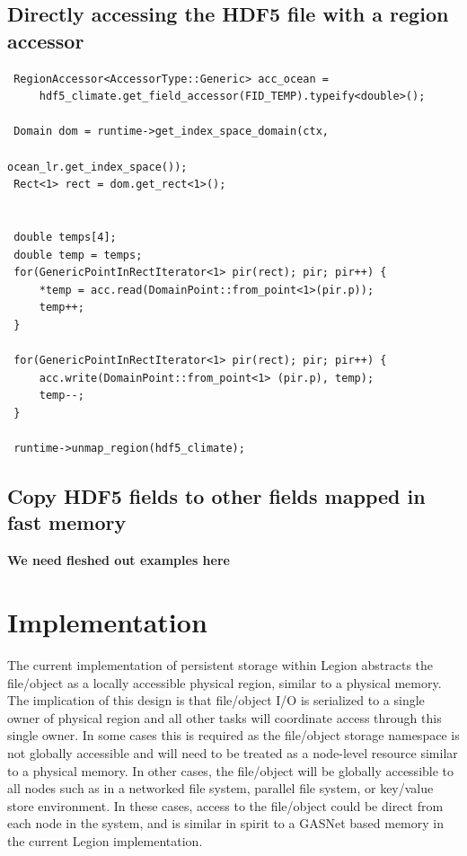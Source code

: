 \documentclass{article}
\begin{document}
 \subsection{Directly accessing the HDF5 file with a region accessor}
 \begin{lstlisting}
 RegionAccessor<AccessorType::Generic> acc_ocean =
     hdf5_climate.get_field_accessor(FID_TEMP).typeify<double>();
 
 Domain dom = runtime->get_index_space_domain(ctx,
                                              ocean_lr.get_index_space());
 Rect<1> rect = dom.get_rect<1>();
 
 
 double temps[4];
 double temp = temps;
 for(GenericPointInRectIterator<1> pir(rect); pir; pir++) { 
     *temp = acc.read(DomainPoint::from_point<1>(pir.p));
     temp++; 
 }
 
 for(GenericPointInRectIterator<1> pir(rect); pir; pir++) {
     acc.write(DomainPoint::from_point<1> (pir.p), temp);
     temp--;
 }
 
 runtime->unmap_region(hdf5_climate);
 \end{lstlisting}
 
 \subsection{Copy HDF5 fields to other fields mapped in fast memory}
 
 \textbf{We need fleshed out examples here}
 
 
 \section{Implementation}
 The current implementation of persistent storage within Legion abstracts the
file/object as a locally accessible physical region, similar to a physical
memory. The implication of this design is that file/object I/O is serialized
to a single owner of physical region and all other tasks will coordinate
access through this single owner. In some cases this is required as the
file/object storage namespace is not globally accessible and will need to be
treated as a node-level resource similar to a physical memory. In other cases,
the file/object will be globally accessible to all nodes such as in a
networked file system, parallel file system, or key/value store
environment. In these cases, access to the file/object could be direct from
each node in the system, and is similar in spirit to a GASNet based memory in
the current Legion implementation.
\end{document}
